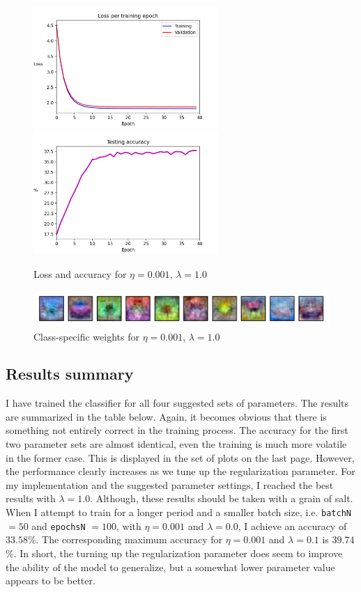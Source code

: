 \documentclass{article}
\begin{document}
	\begin{figure}[h!]
		\centering
		\includegraphics[width=7cm]{../plots/loss_v4.png}
		\includegraphics[width=7cm]{../plots/acc_v4.png}
		\caption{Loss and accuracy for $\eta=0.001$, $\lambda=1.0$}
		\vspace{0.2cm}
		\includegraphics[width=12cm]{../plots/weights_v4.png}
		\caption{Class-specific weights for $\eta=0.001$, $\lambda=1.0$}
	\end{figure}

\subsection*{Results summary}
	I have trained the classifier for all four suggested sets of parameters. The results are summarized in the table below. Again, it becomes obvious that there is something not entirely correct in the training process. The accuracy for the first two parameter sets are almost identical, even the training is much more volatile in the former case. This is displayed in the set of plots on the last page. However, the performance clearly increases as we tune up the regularization parameter. For my implementation and the suggested parameter settings, I reached the best results with $\lambda = 1.0$. Although, these results should be taken with a grain of salt. When I attempt to train for a longer period and a smaller batch size, i.e. \texttt{batchN} $=50$ and \texttt{epochsN} $=100$, with $\eta=0.001$ and $\lambda=0.0$, I achieve an accuracy of $33.58$\%. The corresponding maximum accuracy for $\eta=0.001$ and $\lambda=0.1$ is $39.74$\%. In short, the turning up the regularization parameter does seem to improve the ability of the model to generalize, but a somewhat lower parameter value appears to be better.
\end{document}
